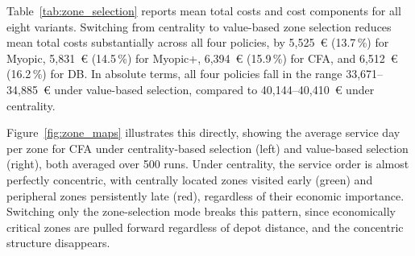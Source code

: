 \documentclass[12pt,oneside]{article}
\begin{document}
Table~\ref{tab:zone_selection} reports mean total costs and cost components for all eight variants. Switching from centrality to value-based zone selection reduces mean total costs substantially across all four policies, by 5{,}525~€ (13.7\,\%) for Myopic, 5{,}831~€ (14.5\,\%) for Myopic+, 6{,}394~€ (15.9\,\%) for CFA, and 6{,}512~€ (16.2\,\%) for DB. In absolute terms, all four policies fall in the range 33{,}671--34{,}885~€ under value-based selection, compared to 40{,}144--40{,}410~€ under centrality.

\begin{table}[H]
\centering
\caption{Cost comparison across zone-selection modes for all four policies (500 runs each). $\Delta$ is computed relative to centrality for each policy.}
\label{tab:zone_selection}
\end{table}

Figure~\ref{fig:zone_maps} illustrates this directly, showing the average service day per zone for CFA under centrality-based selection (left) and value-based selection (right), both averaged over 500 runs. Under centrality, the service order is almost perfectly concentric, with centrally located zones visited early (green) and peripheral zones persistently late (red), regardless of their economic importance. Switching only the zone-selection mode breaks this pattern, since economically critical zones are pulled forward regardless of depot distance, and the concentric structure disappears.
\end{document}
